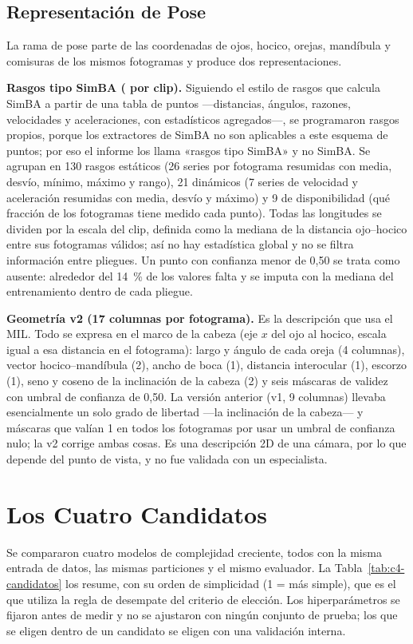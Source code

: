 \subsection{Representación de Pose}
La rama de pose parte de las coordenadas de ojos, hocico, orejas, mandíbula y comisuras de los mismos \Fotogramas{} fotogramas y produce dos representaciones.

\textbf{Rasgos tipo SimBA (\PoseRasgos{} por clip).} Siguiendo el estilo de rasgos que calcula SimBA \parencite{goodwin2024} a partir de una tabla de puntos ---distancias, ángulos, razones, velocidades y aceleraciones, con estadísticos agregados---, se programaron rasgos propios, porque los extractores de SimBA no son aplicables a este esquema de puntos; por eso el informe los llama «rasgos tipo SimBA» y no SimBA. Se agrupan en 130 rasgos estáticos (26 series por fotograma resumidas con media, desvío, mínimo, máximo y rango), 21 dinámicos (7 series de velocidad y aceleración resumidas con media, desvío y máximo) y 9 de disponibilidad (qué fracción de los fotogramas tiene medido cada punto). Todas las longitudes se dividen por la escala del clip, definida como la mediana de la distancia ojo--hocico entre sus fotogramas válidos; así no hay estadística global y no se filtra información entre pliegues. Un punto con confianza menor de 0,50 se trata como ausente: alrededor del 14~\% de los valores falta y se imputa con la mediana del entrenamiento dentro de cada pliegue.

\textbf{Geometría v2 (17 columnas por fotograma).} Es la descripción que usa el MIL. Todo se expresa en el marco de la cabeza (eje $x$ del ojo al hocico, escala igual a esa distancia en el fotograma): largo y ángulo de cada oreja (4 columnas), vector hocico--mandíbula (2), ancho de boca (1), distancia interocular (1), escorzo (1), seno y coseno de la inclinación de la cabeza (2) y seis máscaras de validez con umbral de confianza de 0,50. La versión anterior (v1, 9 columnas) llevaba esencialmente un solo grado de libertad ---la inclinación de la cabeza--- y máscaras que valían 1 en todos los fotogramas por usar un umbral de confianza nulo; la v2 corrige ambas cosas. Es una descripción 2D de una cámara, por lo que depende del punto de vista, y no fue validada con un especialista.

\section{Los Cuatro Candidatos}
Se compararon cuatro modelos de complejidad creciente, todos con la misma entrada de datos, las mismas particiones y el mismo evaluador. La Tabla~\ref{tab:c4-candidatos} los resume, con su orden de simplicidad (1 = más simple), que es el que utiliza la regla de desempate del criterio de elección. Los hiperparámetros se fijaron antes de medir y no se ajustaron con ningún conjunto de prueba; los que se eligen dentro de un candidato se eligen con una validación interna.

